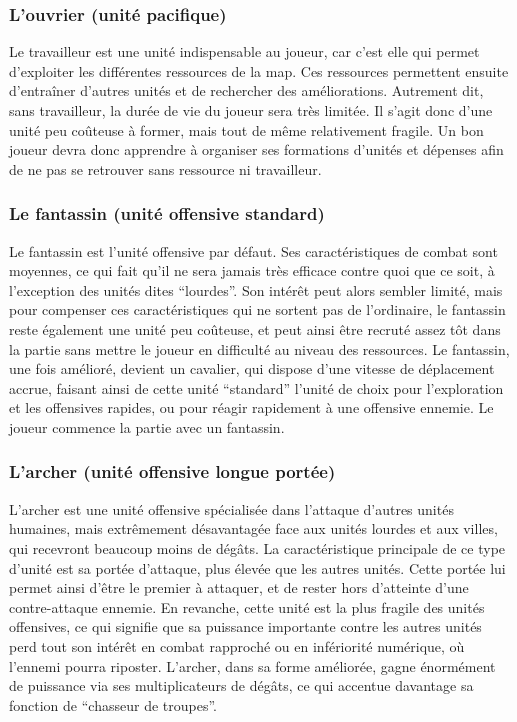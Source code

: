 \documentclass[12pt]{report}
\begin{document}
\subsubsection{L'ouvrier (unité pacifique)}

Le travailleur est une unité indispensable au joueur, car c’est elle qui permet
d’exploiter les différentes ressources de la map. Ces ressources permettent
ensuite d'entraîner d’autres unités et de rechercher des améliorations.
Autrement dit, sans travailleur, la durée de vie du joueur sera très limitée. Il
s’agit donc d’une unité peu coûteuse à former, mais tout de même relativement
fragile. Un bon joueur devra donc apprendre à organiser ses formations d’unités
et dépenses afin de ne pas se retrouver sans ressource ni travailleur.

\subsubsection{Le fantassin (unité offensive standard)}

Le fantassin est l’unité offensive par défaut. Ses caractéristiques de combat
sont moyennes, ce qui fait qu’il ne sera jamais très efficace contre quoi que ce
soit, à l’exception des unités dites “lourdes”. Son intérêt peut alors sembler
limité, mais pour compenser ces caractéristiques qui ne sortent pas de
l’ordinaire, le fantassin reste également une unité peu coûteuse, et peut ainsi
être recruté assez tôt dans la partie sans mettre le joueur en difficulté au
niveau des ressources. Le fantassin, une fois amélioré, devient un cavalier, qui
dispose d’une vitesse de déplacement accrue, faisant ainsi de cette unité
“standard” l’unité de choix pour l’exploration et les offensives rapides, ou
pour réagir rapidement à une offensive ennemie. Le joueur commence la partie
avec un fantassin.

\subsubsection{L'archer (unité offensive longue portée)}

L’archer est une unité offensive spécialisée dans l’attaque d’autres unités
humaines, mais extrêmement désavantagée face aux unités lourdes et aux villes,
qui recevront beaucoup moins de dégâts. La caractéristique principale de ce type
d’unité est sa portée d’attaque, plus élevée que les autres unités. Cette portée
lui permet ainsi d’être le premier à attaquer, et de rester hors d’atteinte
d’une contre-attaque ennemie. En revanche, cette unité est la plus fragile des
unités offensives, ce qui signifie que sa puissance importante contre les autres
unités perd tout son intérêt en combat rapproché ou en infériorité numérique, où
l’ennemi pourra riposter. L’archer, dans sa forme améliorée, gagne énormément de
puissance via ses multiplicateurs de dégâts, ce qui accentue davantage sa
fonction de “chasseur de troupes”.
\end{document}
